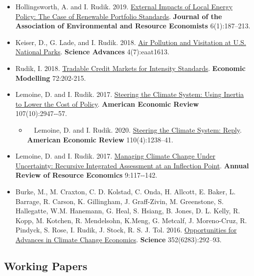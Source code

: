 \documentclass[11pt]{res} %
\begin{document}
\begin{resume}
\begin{itemize}
	\item[] Hollingsworth, A. and I. Rudik. 2019. \href{http://papers.ssrn.com/sol3/papers.cfm?abstract_id=2697222}{External Impacts of Local Energy Policy: The Case of Renewable Portfolio Standards}. \textbf{Journal of the Association of Environmental and Resource Economists} 6(1):187--213.
	\item[] Keiser, D., G. Lade, and I. Rudik. 2018. \href{http://advances.sciencemag.org/content/4/7/eaat1613}{Air Pollution and Visitation at U.S. National Parks}. \textbf{Science Advances} 4(7):eaat1613.
	\item[] Rudik, I. 2018. \href{https://www.sciencedirect.com/science/article/pii/S0264999317315651}{Tradable Credit Markets for Intensity Standards}. \textbf{Economic Modelling} 72:202-215.
	\item[] Lemoine, D. and I. Rudik. 2017.  \href{http://papers.ssrn.com/sol3/papers.cfm?abstract_id=2443594}{Steering the Climate System: Using Inertia to Lower the Cost of Policy}. \textbf{American Economic Review} 107(10):2947‐-57.
	\begin{itemize}
		\item[] \,\,\,\, Lemoine, D. and I. Rudik. 2020.  \href{http://papers.ssrn.com/sol3/papers.cfm?abstract_id=2443594}{Steering the Climate System: Reply}. \textbf{American Economic Review} 110(4):1238--41.
	\end{itemize}
	\item[] Lemoine, D. and I. Rudik. 2017. \href{https://papers.ssrn.com/sol3/papers.cfm?abstract_id=2862211}{Managing Climate Change Under Uncertainty: Recursive Integrated Assessment at an Inflection Point}.  \textbf{Annual Review of Resource Economics} 9:117‐-142.
	\item[]  Burke, M., M. Craxton, C. D. Kolstad, C. Onda, H. Allcott, E. Baker, L. Barrage, R. Carson, K. Gillingham, J. Graff-Zivin, M. Greenstone, S. Hallegatte, W.M. Hanemann, G. Heal, S. Hsiang, B. Jones, D. L. Kelly, R. Kopp, M. Kotchen, R. Mendelsohn, K.Meng, G. Metcalf, J. Moreno-Cruz, R. Pindyck, S. Rose, I. Rudik, J. Stock, R. S. J. Tol. 2016. \href{http://science.sciencemag.org/content/352/6283/292.abstract}{Opportunities for Advances in Climate Change Economics}. \textbf{Science} 352(6283):292--93.
\end{itemize} 


\vspace{-.2in}


\subsection{Working Papers}


\end{resume}
\end{document}
